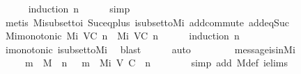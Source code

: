 \begin{isabellebody}
%
\isadelimproof
\ \ \ \ %
\endisadelimproof
%
\isatagproof
{}\isamarkupfalse%
\ {\isacharparenleft}induction\ n{\isacharparenright}\isanewline
\ \ \ \ \isamarkupfalse%
\ simp\isanewline
\ \ \ \ \isamarkupfalse%
\ {\isacharparenleft}metis\ Mi{\isacharunderscore}subset{\isacharunderscore}to{\isacharunderscore}{\isasymSigma}i\ Suc{\isacharunderscore}eq{\isacharunderscore}plus{}\ {\isasymSigma}i{\isacharunderscore}subset{\isacharunderscore}to{\isacharunderscore}Mi\ add{\isachardot}commute\ add{\isacharunderscore}{}{\isacharunderscore}eq{\isacharunderscore}Suc{\isacharparenright}\isanewline
\ \ \ \ \isamarkupfalse%
%
\endisatagproof
{\isafoldproof}%
%
\isadelimproof
\isanewline
%
\endisadelimproof
\isanewline
\ \ \isamarkupfalse%
\ Mi{\isacharunderscore}monotonic{\isacharcolon}\ {\isachardoublequoteopen}M{\isacharunderscore}i\ {\isacharparenleft}V{\isacharcomma}C{\isacharcomma}{\isasymepsilon}{\isacharparenright}\ n\ {\isasymsubseteq}\ M{\isacharunderscore}i\ {\isacharparenleft}V{\isacharcomma}C{\isacharcomma}{\isasymepsilon}{\isacharparenright}\ {\isacharparenleft}n{\isacharplus}{}{\isacharparenright}{\isachardoublequoteclose}\isanewline
%
\isadelimproof
\ \ \ \ %
\endisadelimproof
%
\isatagproof
{}\isamarkupfalse%
\ {\isacharparenleft}induction\ n{\isacharparenright}\isanewline
\ \ \ \ \isamarkupfalse%
\isanewline
\ \ \ \ \isamarkupfalse%
\ {\isasymSigma}i{\isacharunderscore}monotonic\ {\isasymSigma}i{\isacharunderscore}subset{\isacharunderscore}to{\isacharunderscore}Mi\ \isamarkupfalse%
\ blast\isanewline
\ \ \ \ \isamarkupfalse%
\ auto\isanewline
\ \ \ \ \isamarkupfalse%
%
\endisatagproof
{\isafoldproof}%
%
\isadelimproof
\isanewline
%
\endisadelimproof
\isanewline
\ \ \isamarkupfalse%
\ message{\isacharunderscore}is{\isacharunderscore}in{\isacharunderscore}M{\isacharunderscore}i\ {\isacharcolon}\isanewline
\ \ \ \ {\isachardoublequoteopen}{\isasymforall}\ m\ {\isasymin}\ M{\isachardot}\ {\isasymexists}\ n\ {\isasymin}\ {\isasymnat}{\isachardot}\ m\ {\isasymin}\ M{\isacharunderscore}i\ {\isacharparenleft}V{\isacharcomma}\ C{\isacharcomma}\ {\isasymepsilon}{\isacharparenright}\ {\isacharparenleft}n\ {\isacharminus}\ {}{\isacharparenright}{\isachardoublequoteclose}\isanewline
%
\isadelimproof
\ \ \ \ %
\endisadelimproof
%
\isatagproof
{}\isamarkupfalse%
\ {\isacharparenleft}simp\ add{\isacharcolon}\ M{\isacharunderscore}def\ {\isasymSigma}{\isacharunderscore}i{\isachardot}elims{\isacharparenright}\isanewline

\end{isabellebody}
